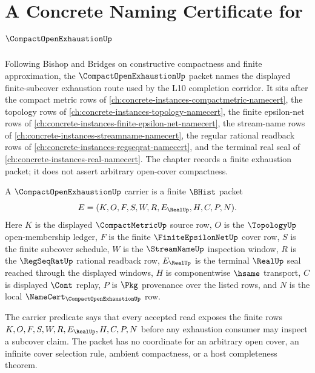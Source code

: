 \chapter{A Concrete Naming Certificate for $\CompactOpenExhaustionUp$}
\label{ch:concrete-instances-compact-open-exhaustion-namecert}

Following Bishop and Bridges on constructive compactness and finite approximation, the $\CompactOpenExhaustionUp$ packet names the displayed finite-subcover exhaustion route used by the L10 completion corridor. It sits after the compact metric rows of \autoref{ch:concrete-instances-compactmetric-namecert}, the topology rows of \autoref{ch:concrete-instances-topology-namecert}, the finite epsilon-net rows of \autoref{ch:concrete-instances-finite-epsilon-net-namecert}, the stream-name rows of \autoref{ch:concrete-instances-streamname-namecert}, the regular rational readback rows of \autoref{ch:concrete-instances-regseqrat-namecert}, and the terminal real seal of \autoref{ch:concrete-instances-real-namecert}. The chapter records a finite exhaustion packet; it does not assert arbitrary open-cover compactness.

\begin{definition}
\label{def:compact-open-exhaustion-carrier}
A $\CompactOpenExhaustionUp$ carrier is a finite $\BHist$ packet
$$
E=(K,O,F,S,W,R,E_{\RealUp},H,C,P,N).
$$
Here $K$ is the displayed $\CompactMetricUp$ source row, $O$ is the $\TopologyUp$ open-membership ledger, $F$ is the finite $\FiniteEpsilonNetUp$ cover row, $S$ is the finite subcover schedule, $W$ is the $\StreamNameUp$ inspection window, $R$ is the $\RegSeqRatUp$ rational readback row, $E_{\RealUp}$ is the terminal $\RealUp$ seal reached through the displayed windows, $H$ is componentwise $\hsame$ transport, $C$ is displayed $\Cont$ replay, $P$ is $\Pkg$ provenance over the listed rows, and $N$ is the local $\NameCert_{\CompactOpenExhaustionUp}$ row.

The carrier predicate says that every accepted read exposes the finite rows $K,O,F,S,W,R,E_{\RealUp},H,C,P,N$ before any exhaustion consumer may inspect a subcover claim. The packet has no coordinate for an arbitrary open cover, an infinite cover selection rule, ambient compactness, or a host completeness theorem.
\end{definition}


